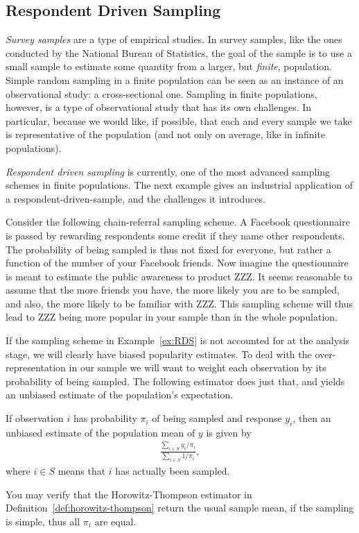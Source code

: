 \subsection{Respondent Driven Sampling}

\emph{Survey samples} are a type of empirical studies. 
In survey samples, like the ones conducted by the National Bureau of Statistics, the goal of the sample is to use a small sample to estimate some quantity from a larger, but \emph{finite}, population.
Simple random sampling in a finite population can be seen as an instance of an observational study: a cross-sectional one. 
Sampling in finite populations, however, is a type of observational study that has its own challenges. In particular, because we would like, if possible, that each and every sample we take is representative of the population (and not only on average, like in infinite populations). 

\emph{Respondent driven sampling} is currently, one of the most advanced sampling schemes in finite populations.
The next example gives an industrial application of a respondent-driven-sample, and the challenges it introduces. 

\begin{example}
	\label{ex:RDS}
	Consider the following chain-referral sampling scheme. 
	A Facebook questionnaire is passed by rewarding respondents some credit if they name other respondents.
	The probability of being sampled is thus not fixed for everyone, but rather a function of the number of your Facebook friends.  
	Now imagine the questionnaire is meant to estimate the public awareness to product ZZZ.
	It seems reasonable to assume that the more friends you have, the more likely you are to be sampled, and also, the more likely to be familiar with ZZZ. 
	This sampling scheme will thus lead to ZZZ being more popular in your sample than in the whole population. 
\end{example}

If the sampling scheme in Example~\ref{ex:RDS} is not accounted for at the analysis stage, we will clearly have biased popularity estimates. 
To deal with the over-representation in our sample we will want to weight each observation by its probability of being sampled. The following estimator does just that, and yields an unbiased estimate of the population's expectation.
\begin{definition}
	\label{def:horowitz-thompson}
	If observation $i$ has probability $\pi_i$ of being sampled and response $y_i$, then an unbiased estimate of the population mean of $y$ is given by 
	\begin{align}
	\frac{\sum_{i \in S} y_i/\pi_i}{\sum_{i \in S} 1/\pi_i},
	\end{align}
	where $i \in S$ means that $i$ has actually been sampled. 
\end{definition}
You may verify that the Horowitz-Thompson estimator in Definition~\ref{def:horowitz-thompson} return the usual sample mean, if the sampling is simple, thus all $\pi_i$ are equal. 








